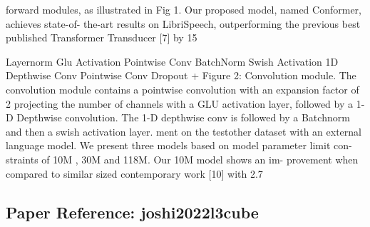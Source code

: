 forward modules, as illustrated in Fig 1. Our proposed model, named Conformer, achieves state-of- the-art results on LibriSpeech, outperforming the previous best published Transformer Transducer [7] by 15%

Layernorm Glu Activation Pointwise Conv BatchNorm Swish Activation 1D Depthwise Conv Pointwise Conv Dropout + Figure 2: Convolution module. The convolution module contains a pointwise convolution with an expansion factor of 2 projecting the number of channels with a GLU activation layer, followed by a 1-D Depthwise convolution. The 1-D depthwise conv is followed by a Batchnorm and then a swish activation layer. ment on the testother dataset with an external language model. We present three models based on model parameter limit con- straints of 10M , 30M and 118M. Our 10M model shows an im- provement when compared to similar sized contemporary work [10] with 2.7%

\vspace{18pt}


\subsection*{Paper Reference: joshi2022l3cube}

